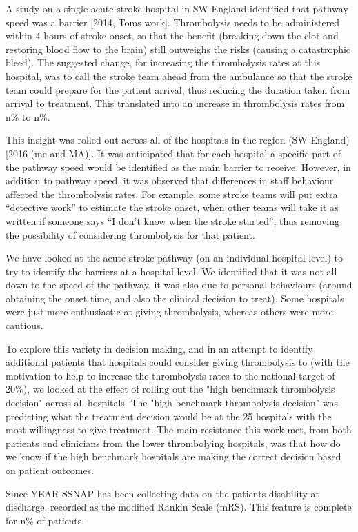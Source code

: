 A study on a single acute stroke hospital in SW England identified that pathway speed was a barrier [2014, Toms work]. Thrombolysis needs to be administered within 4 hours of stroke onset, so that the benefit (breaking down the clot and restoring blood flow to the brain) still outweighs the risks (causing a catastrophic bleed). The suggested change, for increasing the thrombolysis rates at this hospital, was to call the stroke team ahead from the ambulance so that the stroke team could prepare for the patient arrival, thus reducing the duration taken from arrival to treatment. This translated into an increase in thrombolysis rates from n\% to n\%.

This insight was rolled out across all of the hospitals in the region (SW England) [2016 (me and MA)]. It was anticipated that for each hospital a specific part of the pathway speed would be identified as the main barrier to receive. However, in addition to pathway speed, it was observed that differences in staff behaviour affected the thrombolysis rates. For example, some stroke teams will put extra “detective work” to estimate the stroke onset, when other teams will take it as written if someone says “I don’t know when the stroke started”, thus removing the possibility of considering thrombolysis for that patient. 

We have looked at the acute stroke pathway (on an individual hospital level) to try to identify the barriers at a hospital level. We identified that it was not all down to the speed of the pathway, it was also due to personal behaviours (around obtaining the onset time, and also the clinical decision to treat). Some hospitals were just more enthusiastic at giving thrombolysis, whereas others were more cautious.

To explore this variety in decision making, and in an attempt to identify additional patients that hospitals could consider giving thrombolysis to (with the motivation to help to increase the thrombolysis rates to the national target of 20\%), we looked at the effect of rolling out the "high benchmark thrombolysis decision" across all hospitals. The "high benchmark thrombolysis decision" was predicting what the treatment decision would be at the 25 hospitals with the most willingness to give treatment. The main resistance this work met, from both patients and clinicians from the lower thrombolying hospitals, was that how do we know if the high benchmark hospitals are making the correct decision based on patient outcomes.

Since YEAR SSNAP has been collecting data on the patients disability at discharge, recorded as the modified Rankin Scale (mRS). This feature is complete for n\% of patients.

